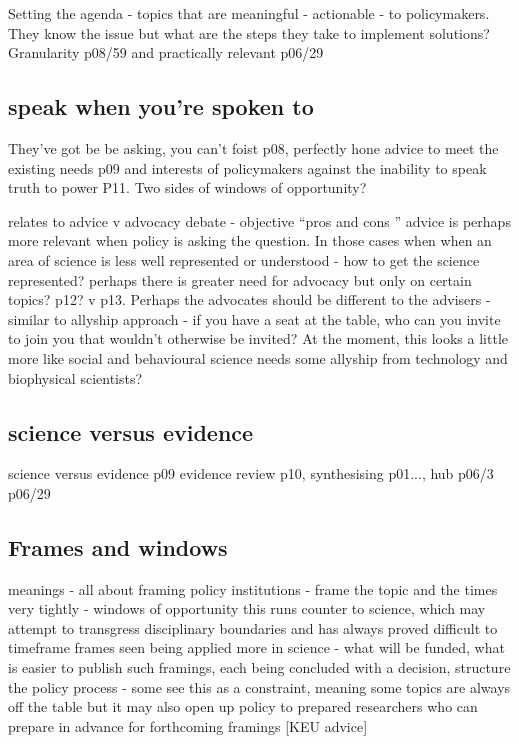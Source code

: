 Setting the agenda - topics that are meaningful - actionable - to policymakers. They know the issue but what are the steps they take to implement solutions? Granularity p08/59 and practically relevant p06/29


\subsection{speak when you're spoken to}
They've got be be asking, you can't foist p08, perfectly hone advice to meet the existing needs p09 and interests of policymakers against the inability to speak truth to power P11. Two sides of windows of opportunity?

relates to advice v advocacy debate - objective ``pros and cons '' advice is perhaps more relevant when policy is asking the question. In those cases when when an area of science is less well represented or understood - how to get the science represented? perhaps there is greater need for advocacy but only on certain topics? p12? v p13. Perhaps the advocates should be different to the advisers - similar to allyship approach - if you have a seat at the table, who can you invite to join you that wouldn't otherwise be invited? At the moment, this looks a little more like social and behavioural science needs some allyship from technology and biophysical scientists?





\subsection{science versus evidence}
science versus evidence p09
evidence review p10, synthesising p01..., hub p06/3 p06/29

\subsection{Frames and windows}
meanings - all about framing
policy institutions - frame the topic and the times very tightly - windows of opportunity
this runs counter to science, which may attempt to transgress disciplinary boundaries and has always proved difficult to timeframe
frames seen being applied more in science - what will be funded, what is easier to publish
such framings, each being concluded with a decision, structure the policy process
- some see this as a constraint, meaning some topics are always off the table but it may also open up policy to prepared researchers who can prepare in advance for forthcoming framings [KEU advice]

